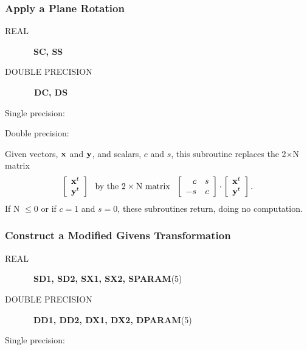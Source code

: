 \documentclass[twoside]{MATH77}
\begin{document}
\subsubsection{Apply a Plane Rotation\label{B5}}
\begin{description}
\item[REAL]  \ {\bf SC, SS }

\item[DOUBLE PRECISION]  {\bf \ DC, DS }
\end{description}
Single precision:

\begin{center}
\end{center}

Double precision:

\begin{center}
\end{center}

Given vectors, ${\bf x}$ and ${\bf y}$, and scalars, $c$ and $s$, this
subroutine replaces the 2$\times $N matrix%
\begin{equation*}
\left[
\begin{array}{c}
{\bf x}^t \\ {\bf y}^t
\end{array}
\right] \ \ \text{by the 2}\times \text{N matrix}\ \ \left[
\begin{array}{rr}
c & s \\
-s & c
\end{array}
\right] \cdot \left[
\begin{array}{c}
{\bf x}^t \\ {\bf y}^t
\end{array}
\right] .
\end{equation*}
If N $\leq 0$ or if $c=1$ and $s=0$, these subroutines return, doing no
computation.

\subsubsection{Construct a Modified Givens Transformation\label{B6}}
\begin{description}
\item[REAL]  \ {\bf SD1, SD2, SX1, SX2, SPARAM}(5)

\item[DOUBLE PRECISION]  \ {\bf DD1, DD2, DX1, DX2, DPARAM}(5)
\end{description}
Single precision:
\end{document}
